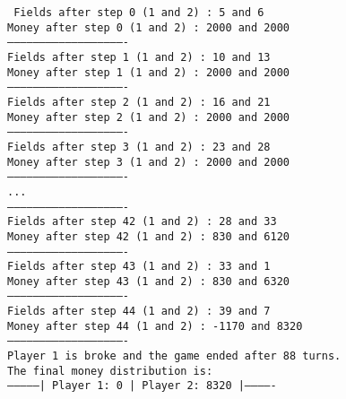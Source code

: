 \begin{center}
  \texttt{
  Fields after step  0 (1 and 2) :  5  and  6 \\
  Money after step 0 (1 and 2)  :  2000  and  2000	\\		
  -------------------------------------------------------\\
  Fields after step  1 (1 and 2) :  10  and  13\\
  Money after step 1 (1 and 2)  :  2000  and  2000\\
  -------------------------------------------------------\\
  Fields after step  2 (1 and 2) :  16  and  21\\
  Money after step 2 (1 and 2)  :  2000  and  2000\\
  -------------------------------------------------------\\
  Fields after step  3 (1 and 2) :  23  and  28\\
  Money after step 3 (1 and 2)  :  2000  and  2000\\
  -------------------------------------------------------\\
  ...\\
  -------------------------------------------------------\\
  Fields after step  42 (1 and 2) :  28  and  33\\
  Money after step 42 (1 and 2)  :  830  and  6120\\
  -------------------------------------------------------\\
  Fields after step  43 (1 and 2) :  33  and  1\\
  Money after step 43 (1 and 2)  :  830  and  6320\\
  -------------------------------------------------------\\
  Fields after step  44 (1 and 2) :  39  and  7\\
  Money after step 44 (1 and 2)  :  -1170  and  8320\\
  -------------------------------------------------------\\
  Player 1 is broke and the game ended after 88 turns.\\
  The final money distribution is: \\
  ---------------| Player 1: 0  | Player 2: 8320  |-------------}
\end{center}

\vspace{1\baselineskip}

